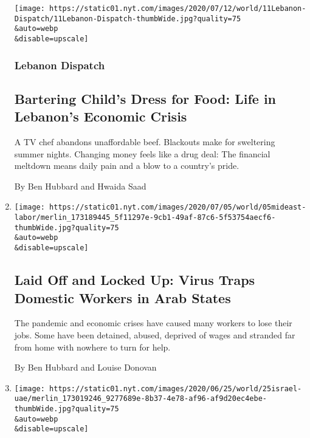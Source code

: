 \begin{enumerate}
  \texttt{[image: https://static01.nyt.com/images/2020/07/12/world/11Lebanon-Dispatch/11Lebanon-Dispatch-thumbWide.jpg?quality=75\\\&auto=webp\\\&disable=upscale]}

  \hypertarget{lebanon-dispatch}{%
  \subsubsection{Lebanon Dispatch}\label{lebanon-dispatch}}

  \hypertarget{bartering-childs-dress-for-food-life-in-lebanons-economic-crisis}{%
  \subsection{Bartering Child's Dress for Food: Life in Lebanon's
  Economic
  Crisis}\label{bartering-childs-dress-for-food-life-in-lebanons-economic-crisis}}

  A TV chef abandons unaffordable beef. Blackouts make for sweltering
  summer nights. Changing money feels like a drug deal: The financial
  meltdown means daily pain and a blow to a country's pride.

  By Ben Hubbard and Hwaida Saad
\item
  \href{/2020/07/06/world/middleeast/coronavirus-saudi-domestic-workers-maids-arab.html}{}

  \texttt{[image: https://static01.nyt.com/images/2020/07/05/world/05mideast-labor/merlin\_173189445\_5f11297e-9cb1-49af-87c6-5f53754aecf6-thumbWide.jpg?quality=75\\\&auto=webp\\\&disable=upscale]}

  \hypertarget{laid-off-and-locked-up-virus-traps-domestic-workers-in-arab-states}{%
  \subsection{Laid Off and Locked Up: Virus Traps Domestic Workers in
  Arab
  States}\label{laid-off-and-locked-up-virus-traps-domestic-workers-in-arab-states}}

  The pandemic and economic crises have caused many workers to lose
  their jobs. Some have been detained, abused, deprived of wages and
  stranded far from home with nowhere to turn for help.

  By Ben Hubbard and Louise Donovan
\item
  \href{/2020/06/25/world/middleeast/israel-united-arab-emirates-coronavirus.html}{}

  \texttt{[image: https://static01.nyt.com/images/2020/06/25/world/25israel-uae/merlin\_173019246\_9277689e-8b37-4e78-af96-af9d20ec4ebe-thumbWide.jpg?quality=75\\\&auto=webp\\\&disable=upscale]}


\end{enumerate}
